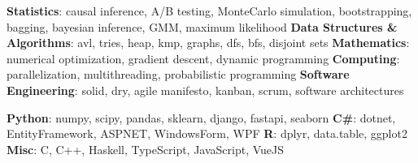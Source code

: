 \documentclass[a4paper]{mctemplate} %
\begin{document}
\begin{sidebar}

\makepicture{2.1cm}


\begin{contacttable}
\end{contacttable}


\begin{skilltable}
	\skillitem
	{\textbf{Statistics}: causal inference, A/B testing, MonteCarlo simulation, bootstrapping, bagging, bayesian inference, GMM, maximum likelihood}
	\skillitem
	{\textbf{Data Structures \& Algorithms}: avl, tries, heap, kmp, graphs, dfs, bfs, disjoint sets}
	\skillitem
	{\textbf{Mathematics}: numerical optimization, gradient descent, dynamic programming}
	\skillitem
	{\textbf{Computing}: parallelization, multithreading, probabilistic programming}
    \skillitem
	{\textbf{Software Engineering}: solid, dry, agile manifesto, kanban, scrum, software architectures}
\end{skilltable}




\begin{codingtable}
	{\textbf{Python}: numpy, scipy, pandas, sklearn, django, fastapi, seaborn}
	{\textbf{C\#}: dotnet, EntityFramework, ASPNET, WindowsForm, WPF}
	{\textbf{R}: dplyr, data.table, ggplot2}
	{\textbf{Misc}: C, C++, Haskell, TypeScript, JavaScript, VueJS}
\end{codingtable}


\end{sidebar}
\end{document}
